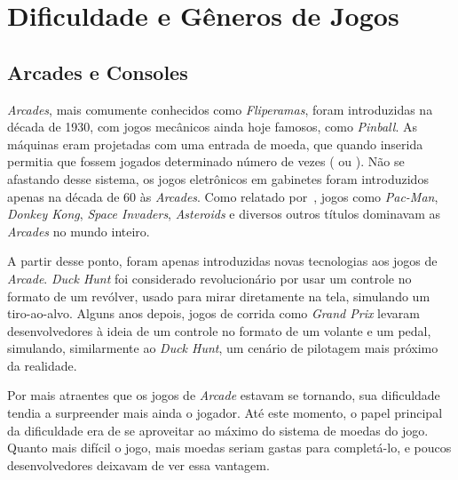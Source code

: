 
\chapter{Dificuldade e Gêneros de Jogos}
\label{cap:dificuldade e generos de jogos}
\section{Arcades e Consoles}

\textit{Arcades}, mais comumente conhecidos como \textit{Fliperamas}, foram introduzidas na década de 1930, com jogos mecânicos ainda hoje famosos, como \textit{Pinball}. As máquinas eram projetadas com uma entrada de moeda, que quando inserida permitia que fossem jogados determinado número de vezes (\textquotedbl{} ou \textquotedbl{}). Não se afastando desse sistema, os jogos eletrônicos em gabinetes foram introduzidos apenas na década de 60 às \textit{Arcades}. Como relatado por~\citet{ArcadeGaming}, jogos como \textit{Pac-Man}, \textit{Donkey Kong}, \textit{Space Invaders}, \textit{Asteroids} e diversos outros títulos dominavam as \textit{Arcades} no mundo inteiro.

A partir desse ponto, foram apenas introduzidas novas tecnologias aos jogos de \textit{Arcade}. \textit{Duck Hunt} foi considerado revolucionário por usar um controle no formato  de um revólver, usado para mirar diretamente na tela, simulando um tiro-ao-alvo. Alguns anos depois, jogos de corrida como \textit{Grand Prix} levaram desenvolvedores à ideia de um controle no formato de um volante e um pedal, simulando, similarmente ao \textit{Duck Hunt}, um cenário de pilotagem mais próximo da realidade.

Por mais atraentes que os jogos de \textit{Arcade} estavam se tornando, sua dificuldade tendia a surpreender mais ainda o jogador. Até este momento, o papel principal da dificuldade era de se aproveitar ao máximo do sistema de moedas do jogo. Quanto mais difícil o jogo, mais moedas seriam gastas para completá-lo, e poucos desenvolvedores deixavam de ver essa vantagem.

